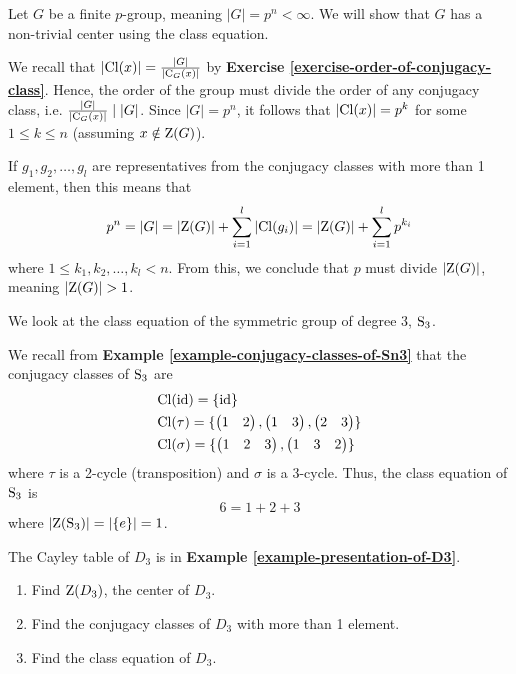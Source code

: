 \begin{example}\label{example-group-with-prime-power-order-has-non-trivial-center}
    Let $G$ be a finite $p$-group, meaning $|G| = p^n < \infty$. We will show that $G$ has a non-trivial center using the class equation.

    We recall that $|\mathrm{Cl}(x)| = \frac{|G|}{|\mathrm{C}_{G}(x)|}$ by \textbf{Exercise \ref{exercise-order-of-conjugacy-class}}. Hence, the order of the group must divide the order of any conjugacy class, i.e. $\frac{|G|}{|\mathrm{C}_{G}(x)|} \mid |G|$. Since $|G| = p^n$, it follows that $|\mathrm{Cl}(x)| = p^k$ for some $1 \leq k \leq n$ (assuming $x \notin \mathrm{Z}(G)$).

    If $g_1, g_2, \dots, g_l$ are representatives from the conjugacy classes with more than 1 element, then this means that
    \[
        p^n = |G| = |\mathrm{Z}(G)| + \sum_{i=1}^l |\mathrm{Cl}(g_i)| = |\mathrm{Z}(G)| + \sum_{i=1}^l p^{k_i}
    \]
    where $1 \leq k_1, k_2, \dots, k_l < n$. From this, we conclude that $p$ must divide $|\mathrm{Z}(G)|$, meaning $|\mathrm{Z}(G)| > 1$.
\end{example}
\begin{example}
    We look at the class equation of the symmetric group of degree 3, $\mathrm{S}_{3}$.

    We recall from \textbf{Example \ref{example-conjugacy-classes-of-Sn3}} that the conjugacy classes of $\mathrm{S}_{3}$ are
    \begin{align*}
        &\mathrm{Cl}(\mathrm{id}) = \{\mathrm{id}\}\\
        &\mathrm{Cl}(\tau) = \{\begin{pmatrix}1 & 2\end{pmatrix}, \begin{pmatrix}1 & 3\end{pmatrix}, \begin{pmatrix}2 & 3\end{pmatrix}\}\\
        &\mathrm{Cl}(\sigma) = \{\begin{pmatrix}1 & 2 & 3\end{pmatrix}, \begin{pmatrix}1 & 3 & 2\end{pmatrix}\}
    \end{align*}
    where $\tau$ is a 2-cycle (transposition) and $\sigma$ is a 3-cycle. Thus, the class equation of $\mathrm{S}_{3}$ is
    \[
        6 = 1 + 2 + 3
    \]
    where $|\mathrm{Z}(\mathrm{S}_{3})| = |\{e\}| = 1$.
\end{example}

\begin{exercise}
    The Cayley table of $D_3$ is in \textbf{Example \ref{example-presentation-of-D3}}.
    \begin{enumerate}[label=(\alph*)]
        \item Find $\mathrm{Z}(D_3)$, the center of $D_3$.
        \item Find the conjugacy classes of $D_3$ with more than 1 element.
        \item Find the class equation of $D_3$.
    \end{enumerate}
\end{exercise}

